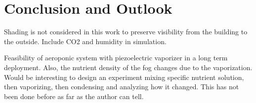 \chapter{Conclusion and Outlook}
\label{chap:conclusion}
%
Shading is not considered in this work to preserve visibility from the building to the outside.
Include CO2 and humidity in simulation.

Feasibility of aeroponic system with piezoelectric vaporizer in a long term deployment.
Also, the nutrient density of the fog changes due to the vaporization.
Would be interesting to design an experiment mixing specific nutrient solution, then vaporizing, then condensing and analyzing how it changed.
This has not been done before as far as the author can tell.

